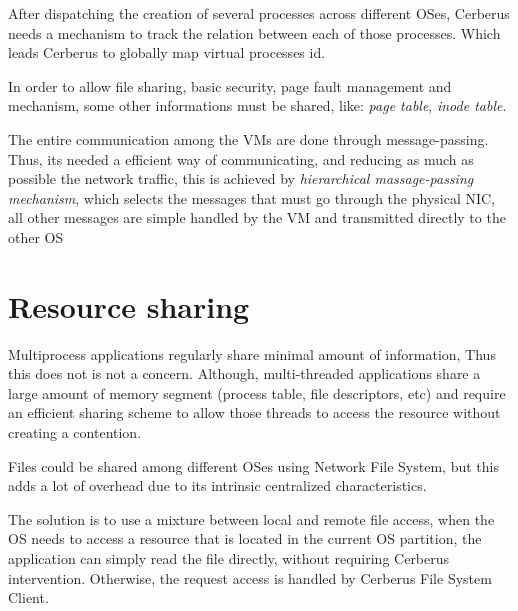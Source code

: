 \documentclass[journal]{IEEEtran}
\begin{document}
\begin{itemize}
	After dispatching the creation of several processes across different OSes, Cerberus needs a mechanism to track the relation between each of those processes. Which leads Cerberus to globally map virtual processes id. %
	
	In order to allow file sharing, basic security, page fault management and mechanism, some other informations must be shared, like: \emph{page table}, \emph{inode table}. 
	
	The entire communication among the VMs are done through message-passing. Thus, its needed a efficient way of communicating, and reducing as much as possible the network traffic, this is achieved by \emph{hierarchical massage-passing mechanism}, which selects the messages that must go through the physical NIC, all other messages are simple handled by the VM and transmitted directly to the other OS
	
	\section{Resource sharing}
	
	Multiprocess applications regularly share minimal amount of information, Thus this does not is not a concern. Although, multi-threaded applications share a large amount of memory segment (process table, file descriptors, etc) and require an efficient sharing scheme to allow those threads to access the resource without creating a contention. %
	
	
	
	
	Files could be shared among different OSes using Network File System, but this adds a lot of overhead due to its intrinsic centralized characteristics.
	
	The solution is to use a mixture between local and remote file access, when the OS needs to access a resource that is located in the current OS partition, the application can simply read the file directly, without requiring Cerberus intervention. Otherwise, the request access is handled by Cerberus File System Client.%
	

\end{itemize}
\end{document}
